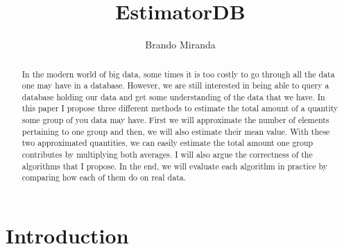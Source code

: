 \documentclass[a4paper]{article}
\title{EstimatorDB}
\author{Brando Miranda}
\begin{document}
\maketitle

\begin{abstract}
In the modern world of big data, some times it is too costly to go through all the data one may have in a database.
However, we are still interested in being able to query a database holding our data and get some understanding of the data that we have.
In this paper I propose three different methods to estimate the total amount of a quantity some group of you data may have.
First we will approximate the number of elements pertaining to one group and then, we will also estimate their mean value.
With these two approximated quantities, we can easily estimate the total amount one group contributes by multiplying both averages.
I will also argue the correctness of the algorithms that I propose.
In the end, we will evaluate each algorithm in practice by comparing how each of them do on real data.
\end{abstract}

\section{Introduction}
\end{document}
